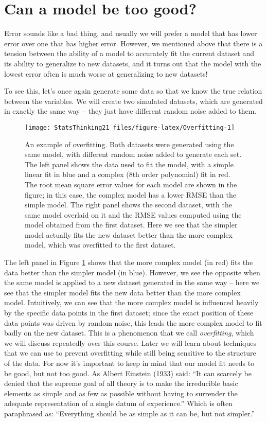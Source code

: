 \documentclass[]{book}
\theoremstyle{definition}
\theoremstyle{definition}
\theoremstyle{definition}
\theoremstyle{remark}
\begin{document}
\section{Can a model be too good?}\label{overfitting}

Error sounds like a bad thing, and usually we will prefer a model that
has lower error over one that has higher error. However, we mentioned
above that there is a tension between the ability of a model to
accurately fit the current dataset and its ability to generalize to new
datasets, and it turns out that the model with the lowest error often is
much worse at generalizing to new datasets!

To see this, let's once again generate some data so that we know the
true relation between the variables. We will create two simulated
datasets, which are generated in exactly the same way -- they just have
different random noise added to them.

\begin{figure}
\texttt{[image: StatsThinking21\_files/figure-latex/Overfitting-1]} \caption{An example of overfitting. Both datasets were generated using the same model, with different random noise added to generate each set.  The left panel shows the data used to fit the model, with a simple linear fit in blue and a complex (8th order polynomial) fit in red.  The root mean square error values for each model are shown in the figure; in this case, the complex model has a lower RMSE than the simple model.  The right panel shows the second dataset, with the same model overlaid on it and the RMSE values computed using the model obtained from the first dataset.  Here we see that the simpler model actually fits the new dataset better than the more complex model, which was overfitted to the first dataset.}\label{fig:Overfitting}
\end{figure}

The left panel in Figure \ref{fig:Overfitting} shows that the more
complex model (in red) fits the data better than the simpler model (in
blue). However, we see the opposite when the same model is applied to a
new dataset generated in the same way -- here we see that the simpler
model fits the new data better than the more complex model. Intuitively,
we can see that the more complex model is influenced heavily by the
specific data points in the first dataset; since the exact position of
these data points was driven by random noise, this leads the more
complex model to fit badly on the new dataset. This is a phenomenon that
we call \emph{overfitting}, which we will discuss repeatedly over this
course. Later we will learn about techniques that we can use to prevent
overfitting while still being sensitive to the structure of the data.
For now it's important to keep in mind that our model fit needs to be
good, but not too good. As Albert Einstein (1933) said: ``It can
scarcely be denied that the supreme goal of all theory is to make the
irreducible basic elements as simple and as few as possible without
having to surrender the adequate representation of a single datum of
experience.'' Which is often paraphrased as: ``Everything should be as
simple as it can be, but not simpler.''
\end{document}
